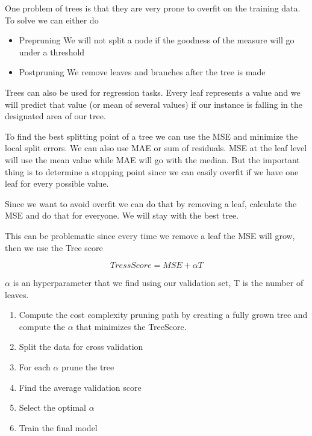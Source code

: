 \vspace{10pt}

One problem of trees is that they are very prone to overfit on the training data. To solve we can either do

\begin{itemize}
    \item Prepruning \ra We will not split a node if the goodness of the measure will go under a threshold
    \item Postpruning \ra We remove leaves and branches after the tree is made
\end{itemize}

\vspace{10pt}

Trees can also be used for regression tasks. Every leaf represents a value and we will predict that value (or mean of several values) if our instance is falling in the designated area of our tree.

To find the best splitting point of a tree we can use the MSE and minimize the local split errors. We can also use MAE or sum of residuals.
MSE at the leaf level will use the mean value while MAE will go with the median. 
But the important thing is to determine a stopping point since we can easily overfit if we have one leaf for every possible value.

\vspace{10pt}

Since we want to avoid overfit we can do that by removing a leaf, calculate the MSE and do that for everyone. We will stay with the best tree.

This can be problematic since every time we remove a leaf the MSE will grow, then we use the Tree score

\[
TressScore = MSE + \alpha T
\]

$\alpha$ is an hyperparameter that we find using our validation set, T is the number of leaves.

\begin{enumerate}
    \item Compute the cost complexity pruning path by creating a fully grown tree and compute the $\alpha$ that minimizes the TreeScore.
    \item Split the data for cross validation
    \item For each $\alpha$ prune the tree
    \item Find the average validation score
    \item Select the optimal $\alpha$
    \item Train the final model
\end{enumerate}

